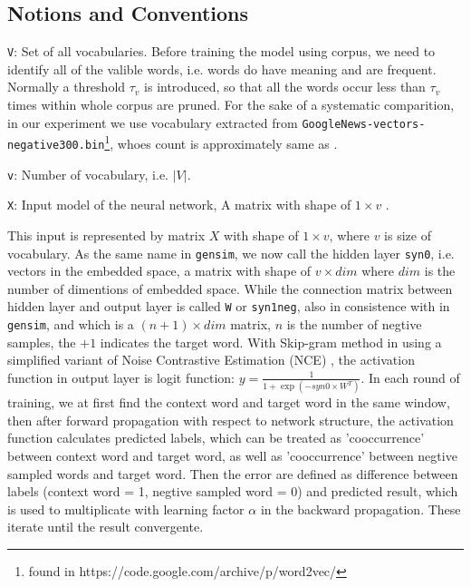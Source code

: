 \documentclass[11pt,a4paper]{article}
\begin{document}
  \subsection{Notions and Conventions}
  \verb|V|: Set of all vocabularies. Before training the model using corpus, we need to identify all of the valible words, i.e. words do have meaning and are frequent. Normally a threshold $\tau_v$ is introduced, so that all the words occur less than $\tau_v$ times within whole corpus are pruned. For the sake of a systematic comparition, in our experiment we use vocabulary extracted from \verb|GoogleNews-vectors-negative300.bin|\footnote{found in https://code.google.com/archive/p/word2vec/}, whoes count is approximately same as \cite{levy2015improving}.

  \verb|v|: Number of vocabulary, i.e. $|V|$.

  \verb|X|: Input model of the neural network, A matrix with shape of $1 \times v$ .

This input is represented by matrix $X$ with shape of $1\times v$, where $v$ is size of vocabulary. As the same name in \verb|gensim|, we now call the hidden layer \verb|syn0|, i.e. vectors in the embedded space, a matrix with shape of $v\times dim$ where $dim$ is the number of dimentions of embedded space. While the connection matrix between hidden layer and output layer is called \verb|W| or \verb|syn1neg|, also in consistence with in \verb|gensim|, and which is a $(n+1)\times dim$ matrix, $n$ is the number of negtive samples, the $+1$ indicates the target word. With Skip-gram method in \cite{mikolov2013distributed} using a simplified variant of Noise Contrastive Estimation (NCE) \cite{gutmann2012noise}, the activation function in output layer is logit function: $y=\frac{1}{1+\exp(-syn0\times W^T)}$. In each round of training, we at first find the context word and target word in the same window, then after forward propagation with respect to network structure, the activation function calculates predicted labels, which can be treated as 'cooccurrence' between context word and target word, as well as 'cooccurrence' between negtive sampled words and target word. Then the error are defined as difference between labels (context word = 1, negtive sampled word = 0) and predicted result, which is used to multiplicate with learning factor $\alpha$ in the backward propagation. These iterate until the result convergente.
\end{document}
